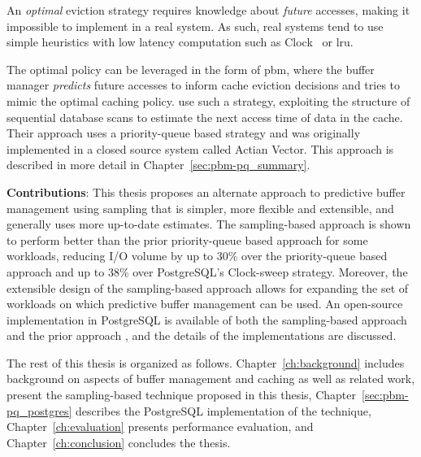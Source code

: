 An \textit{optimal} eviction strategy requires knowledge about \textit{future} accesses, making it impossible to implement in a real system. As such, real systems tend to use simple heuristics with low latency computation such as Clock~\cite{gclock} or \gls{lru}.

The optimal policy can be leveraged in the form of \gls{pbm}, where the buffer manager \textit{predicts} future accesses to inform cache eviction decisions and tries to mimic the optimal caching policy. \citet{pbm} use such a strategy, exploiting the structure of sequential database scans to estimate the next access time of data in the cache. Their approach uses a priority-queue based strategy and was originally implemented in a closed source system called Actian Vector. This approach is described in more detail in Chapter~\ref{sec:pbm-pq_summary}.

\textbf{Contributions}: This thesis proposes an alternate approach to predictive buffer management using sampling that is simpler, more flexible and extensible, and generally uses more up-to-date estimates. The sampling-based approach is shown to perform better than the prior priority-queue based approach for some workloads, reducing I/O volume by up to 30\% over the priority-queue based approach and up to 38\% over PostgreSQL's Clock-sweep strategy. Moreover, the extensible design of the sampling-based approach allows for expanding the set of workloads on which predictive buffer management can be used. An open-source implementation in PostgreSQL is available of both the sampling-based approach and the prior approach \cite{pbm}, and the details of the implementations are discussed.

The rest of this thesis is organized as follows. Chapter~\ref{ch:background} includes background on aspects of buffer management and caching as well as related work,  present the sampling-based technique proposed in this thesis, Chapter~\ref{sec:pbm-pq_postgres} describes the PostgreSQL implementation of the technique, Chapter~\ref{ch:evaluation} presents performance evaluation, and Chapter~\ref{ch:conclusion} concludes the thesis.